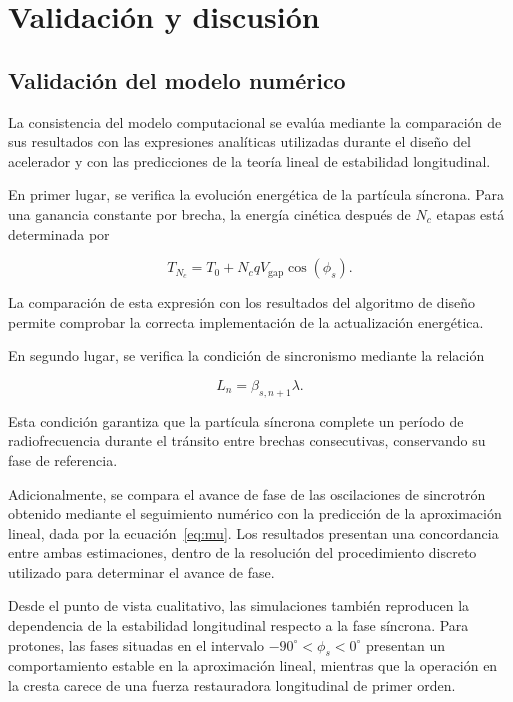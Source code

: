 \chapter{Validación y discusión}

\section{Validación del modelo numérico}

La consistencia del modelo computacional se evalúa mediante la comparación de sus resultados con las expresiones analíticas utilizadas durante el diseño del acelerador y con las predicciones de la teoría lineal de estabilidad longitudinal.

En primer lugar, se verifica la evolución energética de la partícula síncrona. Para una ganancia constante por brecha, la energía cinética después de $N_c$ etapas está determinada por

\begin{equation}
    T_{N_c}
    =
    T_0+
    N_cqV_{\mathrm{gap}}\cos(\phi_s).
\end{equation}

La comparación de esta expresión con los resultados del algoritmo de diseño permite comprobar la correcta implementación de la actualización energética.

En segundo lugar, se verifica la condición de sincronismo mediante la relación

\begin{equation}
    L_n=\beta_{s,n+1}\lambda.
\end{equation}

Esta condición garantiza que la partícula síncrona complete un período de radiofrecuencia durante el tránsito entre brechas consecutivas, conservando su fase de referencia.

Adicionalmente, se compara el avance de fase de las oscilaciones de sincrotrón obtenido mediante el seguimiento numérico con la predicción de la aproximación lineal, dada por la ecuación~\eqref{eq:mu}. Los resultados presentan una concordancia entre ambas estimaciones, dentro de la resolución del procedimiento discreto utilizado para determinar el avance de fase.

Desde el punto de vista cualitativo, las simulaciones también reproducen la dependencia de la estabilidad longitudinal respecto a la fase síncrona. Para protones, las fases situadas en el intervalo $-90^\circ<\phi_s<0^\circ$ presentan un comportamiento estable en la aproximación lineal, mientras que la operación en la cresta carece de una fuerza restauradora longitudinal de primer orden.

